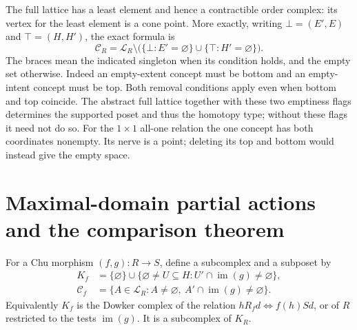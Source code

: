 \documentclass[11pt]{article}
\theoremstyle{remark}
\begin{document}
The full lattice has a least element and hence a contractible order
complex: its vertex for the least element is a cone point. More exactly,
writing $\bot=(E',E)$ and $\top=(H,H')$, the exact formula is
\[
 \mathcal C_R=\mathcal L_R\setminus
 \bigl(\{\bot:E'=\varnothing\}\cup\{\top:H'=\varnothing\}\bigr).
\]
The braces mean the indicated singleton when its condition holds, and the
empty set otherwise. Indeed an empty-extent concept must be bottom and
an empty-intent concept must be top. Both removal conditions apply even
when bottom and top coincide. The abstract full lattice together with
these two emptiness flags determines the supported poset and thus the
homotopy type; without these flags it need not do so.
For the $1\times1$ all-one relation the one concept has both coordinates
nonempty. Its nerve is a point; deleting its top and bottom would instead
give the empty space.

\section{Maximal-domain partial actions and the comparison theorem}

For a Chu morphism $(f,g):R\to S$, define a subcomplex and a subposet by
\begin{align}
 K_f&=\{\varnothing\}\cup
 \{\varnothing\ne U\subseteq H:U'\cap\operatorname{im}(g)\ne\varnothing\},
 \label{nb:partial-complex}\\
 \mathcal C_f&=
 \{A\in\mathcal L_R:A\ne\varnothing,
                    \ A'\cap\operatorname{im}(g)\ne\varnothing\}.
 \label{nb:partial-core}
\end{align}
Equivalently $K_f$ is the Dowker complex of the relation
$hR_f d\Longleftrightarrow f(h)Sd$, or of $R$ restricted to the tests
$\operatorname{im}(g)$. It is a subcomplex of $K_R$.
\end{document}
